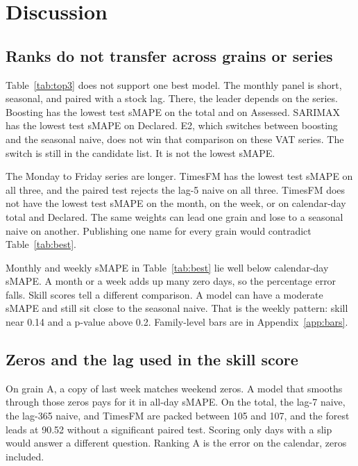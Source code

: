 \section{Discussion}
\label{sec:discussion}

\subsection{Ranks do not transfer across grains or series}
\label{sec:grain-dependence}

Table~\ref{tab:top3} does not support one best model.
The monthly panel is short, seasonal, and paired with a stock lag.
There, the leader depends on the series.
Boosting has the lowest test sMAPE on the total and on Assessed.
SARIMAX has the lowest test sMAPE on Declared.
E2, which switches between boosting and the seasonal naive, does not win that comparison on these VAT series.
The switch is still in the candidate list.
It is not the lowest sMAPE.

The Monday to Friday series are longer.
TimesFM has the lowest test sMAPE on all three, and the paired test rejects the lag-5 naive on all three.
TimesFM does not have the lowest test sMAPE on the month, on the week, or on calendar-day total and Declared.
The same weights can lead one grain and lose to a seasonal naive on another.
Publishing one name for every grain would contradict Table~\ref{tab:best}.

Monthly and weekly sMAPE in Table~\ref{tab:best} lie well below calendar-day sMAPE.
A month or a week adds up many zero days, so the percentage error falls.
Skill scores tell a different comparison.
A model can have a moderate sMAPE and still sit close to the seasonal naive.
That is the weekly pattern: skill near 0.14 and a p-value above 0.2.
Family-level bars are in Appendix~\ref{app:bars}.

\subsection{Zeros and the lag used in the skill score}
\label{sec:zeros}

On grain A, a copy of last week matches weekend zeros.
A model that smooths through those zeros pays for it in all-day sMAPE.
On the total, the lag-7 naive, the lag-365 naive, and TimesFM are packed between 105 and 107, and the forest leads at 90.52 without a significant paired test.
Scoring only days with a slip would answer a different question.
Ranking A is the error on the calendar, zeros included.

